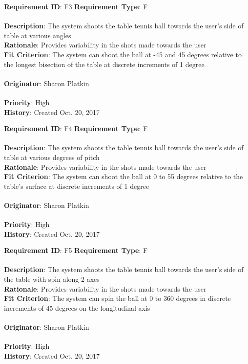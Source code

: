 \documentclass[11pt]{article}
\begin{document}
\begin{framed}
	\noindent\textbf{Requirement ID}: F3 \hfill \textbf{Requirement Type}: F \hfill\\\\
	\noindent\textbf{Description}: The system shoots the table tennis ball towards the user's side of table at various angles \\
	\textbf{Rationale}: Provides variability in the shots made towards the user \\
	\textbf{Fit Criterion}: The system can shoot the ball at -45 and 45 degrees relative to the longest bisection of the table at discrete increments of 1 degree\\\\
	\textbf{Originator}: Sharon Platkin \\\\
	\textbf{Priority}: High \hfill \\
	\noindent\textbf{History}: Created Oct. 20, 2017
\end{framed}

\begin{framed}
	\noindent\textbf{Requirement ID}: F4 \hfill \textbf{Requirement Type}: F \hfill\\\\
	\noindent\textbf{Description}: The system shoots the table tennis ball towards the user's side of table at various degrees of pitch \\
	\textbf{Rationale}: Provides variability in the shots made towards the user \\
	\textbf{Fit Criterion}: The system can shoot the ball at 0 to 55 degrees relative to the table's surface at discrete increments of 1 degree\\\\
	\textbf{Originator}: Sharon Platkin \\\\
	\textbf{Priority}: High \hfill \\
	\noindent\textbf{History}: Created Oct. 20, 2017
\end{framed}

\begin{framed}
	\noindent\textbf{Requirement ID}: F5 \hfill \textbf{Requirement Type}: F \hfill\\\\
	\noindent\textbf{Description}: The system shoots the table tennis ball towards the user's side of the table with spin along 2 axes \\
	\textbf{Rationale}: Provides variability in the shots made towards the user \\
	\textbf{Fit Criterion}: The system can spin the ball at 0 to 360 degrees in discrete increments of 45 degrees on the longitudinal axis\\\\ %
	\textbf{Originator}: Sharon Platkin \\\\
	\textbf{Priority}: High \hfill \\
	\noindent\textbf{History}: Created Oct. 20, 2017
\end{framed}
\end{document}
